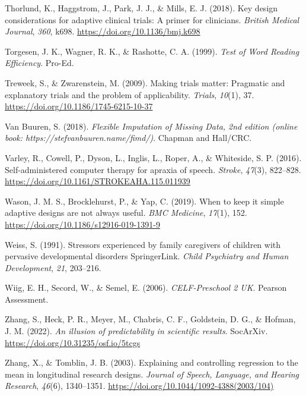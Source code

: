 \documentclass{krantz}
\newlength{\cslhangindent}
\newlength{\cslentryspacingunit} %
\newenvironment{CSLReferences}[2] %
{%
\setlength{\parindent}{0pt}
\ifodd #1
\let\oldpar\par
\def\par{\hangindent=\cslhangindent\oldpar}
\fi
\setlength{\parskip}{#2\cslentryspacingunit}
}%
{}
\begin{document}
\begin{CSLReferences}{1}{0}
\leavevmode{}%
Thorlund, K., Haggstrom, J., Park, J. J., \& Mills, E. J. (2018). Key design considerations for adaptive clinical trials: A primer for clinicians. \emph{British Medical Journal}, \emph{360}, k698. \url{https://doi.org/10.1136/bmj.k698}

\leavevmode{}%
Torgesen, J. K., Wagner, R. K., \& Rashotte, C. A. (1999). \emph{Test of {Word Reading Efficiency}}. {Pro-Ed}.

\leavevmode{}%
Treweek, S., \& Zwarenstein, M. (2009). Making trials matter: Pragmatic and explanatory trials and the problem of applicability. \emph{Trials}, \emph{10}(1), 37. \url{https://doi.org/10.1186/1745-6215-10-37}

\leavevmode{}%
Van Buuren, S. (2018). \emph{Flexible {Imputation} of {Missing Data}, 2nd edition (online book: {https://stefvanbuuren.name/fimd/)}}. {Chapman and Hall/CRC}.

\leavevmode{}%
Varley, R., Cowell, P., Dyson, L., Inglis, L., Roper, A., \& Whiteside, S. P. (2016). Self-administered computer therapy for apraxia of speech. \emph{Stroke}, \emph{47}(3), 822--828. \url{https://doi.org/10.1161/STROKEAHA.115.011939}

\leavevmode{}%
Wason, J. M. S., Brocklehurst, P., \& Yap, C. (2019). When to keep it simple \textendash{} adaptive designs are not always useful. \emph{BMC Medicine}, \emph{17}(1), 152. \url{https://doi.org/10.1186/s12916-019-1391-9}

\leavevmode{}%
Weiss, S. (1991). Stressors experienced by family caregivers of children with pervasive developmental disorders \textbar{} {SpringerLink}. \emph{Child Psychiatry and Human Development}, \emph{21}, 203--216.

\leavevmode{}%
Wiig, E. H., Secord, W., \& Semel, E. (2006). \emph{{CELF-Preschool} 2 {UK}}. {Pearson Assessment}.

\leavevmode{}%
Zhang, S., Heck, P. R., Meyer, M., Chabris, C. F., Goldstein, D. G., \& Hofman, J. M. (2022). \emph{An illusion of predictability in scientific results}. {SocArXiv}. \url{https://doi.org/10.31235/osf.io/5tcgs}

\leavevmode{}%
Zhang, X., \& Tomblin, J. B. (2003). Explaining and controlling regression to the mean in longitudinal research designs. \emph{Journal of Speech, Language, and Hearing Research}, \emph{46}(6), 1340--1351. \url{https://doi.org/10.1044/1092-4388(2003/104)}

\end{CSLReferences}
\end{document}
